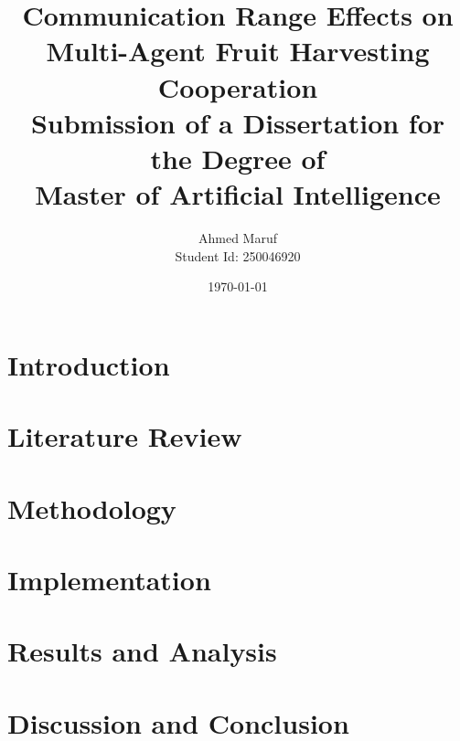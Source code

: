 \documentclass[12pt,a4paper]{report}
\title{
    \textbf{Communication Range Effects on Multi-Agent Fruit Harvesting Cooperation} \\
    \vspace{1cm}
    \large Submission of a Dissertation for the Degree of \\
    Master of Artificial Intelligence
}
\author{Ahmed Maruf \\ Student Id: 250046920}
\date{\today}
\begin{document}
\maketitle

\begin{abstract}

\end{abstract}

\tableofcontents
\listoffigures
\listoftables

\chapter{Introduction}


\chapter{Literature Review}


\chapter{Methodology}


\chapter{Implementation}


\chapter{Results and Analysis}


\chapter{Discussion and Conclusion}





\appendix



\end{document}
